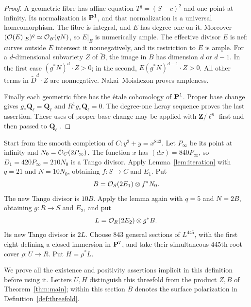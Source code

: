 \begin{proof}
A geometric fibre has affine equation $T^q=(S-c)^2$ and one point at infinity. Its normalization is $\mathbf P^1$, and that normalization is a universal homeomorphism. The fibre is integral, and $E$ has degree one on it. Moreover
$(\mathcal O(E)|_E)^q\simeq\mathcal O_B(qN)$, so $E|_E$ is numerically ample. The effective divisor $E$ is nef: curves outside $E$ intersect it nonnegatively, and its restriction to $E$ is ample. For a $d$-dimensional subvariety $Z$ of $\widetilde B$, the image in $B$ has dimension $d$ or $d-1$. In the first case $(g^*N)^d\cdot Z>0$; in the second, $E(g^*N)^{d-1}\cdot Z>0$. All other terms in $\widetilde D^d\cdot Z$ are nonnegative. Nakai--Moishezon proves ampleness.

Finally each geometric fibre has the étale cohomology of $\mathbf P^1$. Proper base change gives $g_*\mathbf Q_\ell=\mathbf Q_\ell$ and $R^1g_*\mathbf Q_\ell=0$. The degree-one Leray sequence proves the last assertion. These uses of proper base change may be applied with $\mathbf Z/\ell^n$ first and then passed to $\mathbf Q_\ell$ \citep[Exposé XII, Theorem 5.1 and Corollary 5.2, pp.~88--89]{SGA4}.
\end{proof}

\begin{definition}\label{def:threefold}
Start from the smooth completion of $C:y^2+y=x^{843}$. Let $P_\infty$ be its point at infinity and $N_0=\mathcal O_C(2P_\infty)$. The function $x$ has
$(dx)=840P_\infty$, so $D_1=420P_\infty=210N_0$ is a Tango divisor. Apply Lemma~\ref{lem:iteration} with $q=21$ and $N=10N_0$, obtaining $f:S\to C$ and $E_1$. Put
\[
 B=\mathcal O_S(2E_1)\otimes f^*N_0.
\]
The new Tango divisor is $10B$. Apply the lemma again with $q=5$ and $N=2B$, obtaining $g:R\to S$ and $E_2$, and put
\[
 L=\mathcal O_R(2E_2)\otimes g^*B.
\]
Its new Tango divisor is $2L$. Choose 843 general sections of $L^{445}$, with the first eight defining a closed immersion in $\mathbf P^7$, and take their simultaneous 445th-root cover $\rho:U\to R$. Put $H=\rho^*L$.
\end{definition}

We prove all the existence and positivity assertions implicit in this definition before using it. Letters $U,H$ distinguish this threefold from the product $Z,B$ of Theorem~\ref{thm:main}; within this section $B$ denotes the surface polarization in Definition~\ref{def:threefold}.

